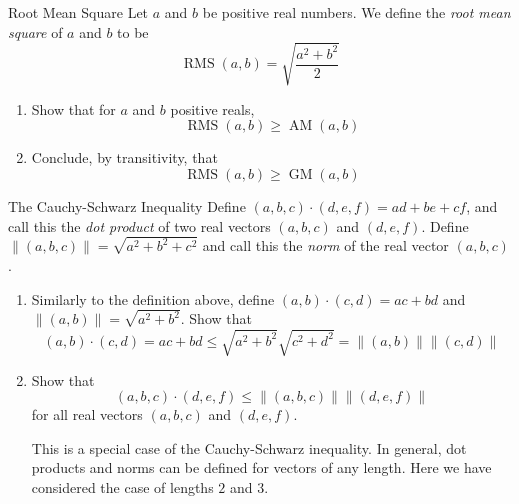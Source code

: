 \documentclass[12pt,letterpaper]{article}
\begin{document}
\begin{problem}{Root Mean Square}
  Let \(a\) and \(b\) be positive real numbers. We define the \emph{root mean
  square} of \(a\) and \(b\) to be \[
    \operatorname{RMS}(a, b) = \sqrt{\frac{a^2 + b^2}{2}}
  \]

\begin{enumerate}
 \item Show that for \(a\) and \(b\) positive reals, \[
  \operatorname{RMS}(a, b) \ge \operatorname{AM}(a, b)
 \]
 \item Conclude, by transitivity, that \[
  \operatorname{RMS}(a, b) \ge \operatorname{GM}(a, b)
 \]
\end{enumerate}
\end{problem}

\begin{problem}{The Cauchy-Schwarz Inequality}
  Define \((a, b, c) \cdot (d, e, f) = ad + be + cf\), and call this the
  \emph{dot product} of two real vectors \((a, b, c)\) and \((d, e, f)\).
  Define \(\|(a, b, c)\| = \sqrt{a^2+b^2+c^2}\) and call this the \emph{norm}
  of the real vector \((a, b, c)\).

  \begin{enumerate}
    \item Similarly to the definition above, define \((a, b) \cdot (c, d) = ac +
    bd\) and \(\|(a, b)\| = \sqrt{a^2 + b^2}\). Show that \[
      (a, b) \cdot (c, d) = ac + bd \le \sqrt{a^2 + b^2}\sqrt{c^2 + d^2}
      = \|(a, b)\|\|(c, d)\|
    \]

    \item Show that \[
      (a, b, c) \cdot (d, e, f) \le \|(a, b, c)\| \|(d, e, f)\|
    \] for all real vectors \((a, b, c)\) and \((d, e, f)\).

    This is a special case of the Cauchy-Schwarz inequality. In general, dot
    products and norms can be defined for vectors of any length. Here we have
    considered the case of lengths \(2\) and \(3\).
  \end{enumerate}
\end{problem}
\end{document}
